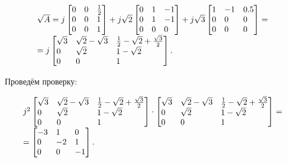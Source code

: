 \begin{equation*}
\begin{matrix}\sqrt A=j\left[\begin{matrix}0\hfill\null &0\hfill\null &\frac 1 2\hfill\null \\0\hfill\null &0\hfill\null
&1\hfill\null \\0\hfill\null &0\hfill\null &1\hfill\null \end{matrix}\right]+j\sqrt 2\left[\begin{matrix}0\hfill\null
&1\hfill\null &-1\hfill\null \\0\hfill\null &1\hfill\null &-1\hfill\null \\0\hfill\null &0\hfill\null &0\hfill\null
\end{matrix}\right]+j\sqrt 3\left[\begin{matrix}1\hfill\null &-1\hfill\null &0.5\hfill\null \\0\hfill\null
&0\hfill\null &0\hfill\null \\0\hfill\null &0\hfill\null &0\hfill\null \end{matrix}\right]=\hfill\null
\\=j\left[\begin{matrix}\sqrt 3\hfill\null &\sqrt 2-\sqrt 3\hfill\null &\frac 1 2-\sqrt 2+\frac{\sqrt 3} 2\hfill\null
\\0\hfill\null &\sqrt 2\hfill\null &1-\sqrt 2\hfill\null \\0\hfill\null &0\hfill\null &1\hfill\null
\end{matrix}\right].\hfill\null \end{matrix}\hfill 
\end{equation*}

		Проведём проверку:


\begin{equation*}
\begin{matrix}j^2\left[\begin{matrix}\sqrt 3\hfill\null &\sqrt 2-\sqrt 3\hfill\null &\frac 1 2-\sqrt 2+\frac{\sqrt 3}
2\hfill\null \\0\hfill\null &\sqrt 2\hfill\null &1-\sqrt 2\hfill\null \\0\hfill\null &0\hfill\null &1\hfill\null
\end{matrix}\right]\cdot \left[\begin{matrix}\sqrt 3\hfill\null &\sqrt 2-\sqrt 3\hfill\null &\frac 1 2-\sqrt
2+\frac{\sqrt 3} 2\hfill\null \\0\hfill\null &\sqrt 2\hfill\null &1-\sqrt 2\hfill\null \\0\hfill\null &0\hfill\null
&1\hfill\null \end{matrix}\right]=\hfill\null \\=\left[\begin{matrix}-3\hfill\null &1\hfill\null &0\hfill\null
\\0\hfill\null &-2\hfill\null &1\hfill\null \\0\hfill\null &0\hfill\null &-1\hfill\null \end{matrix}\right].\hfill\null
\end{matrix}\hfill 
\end{equation*}

